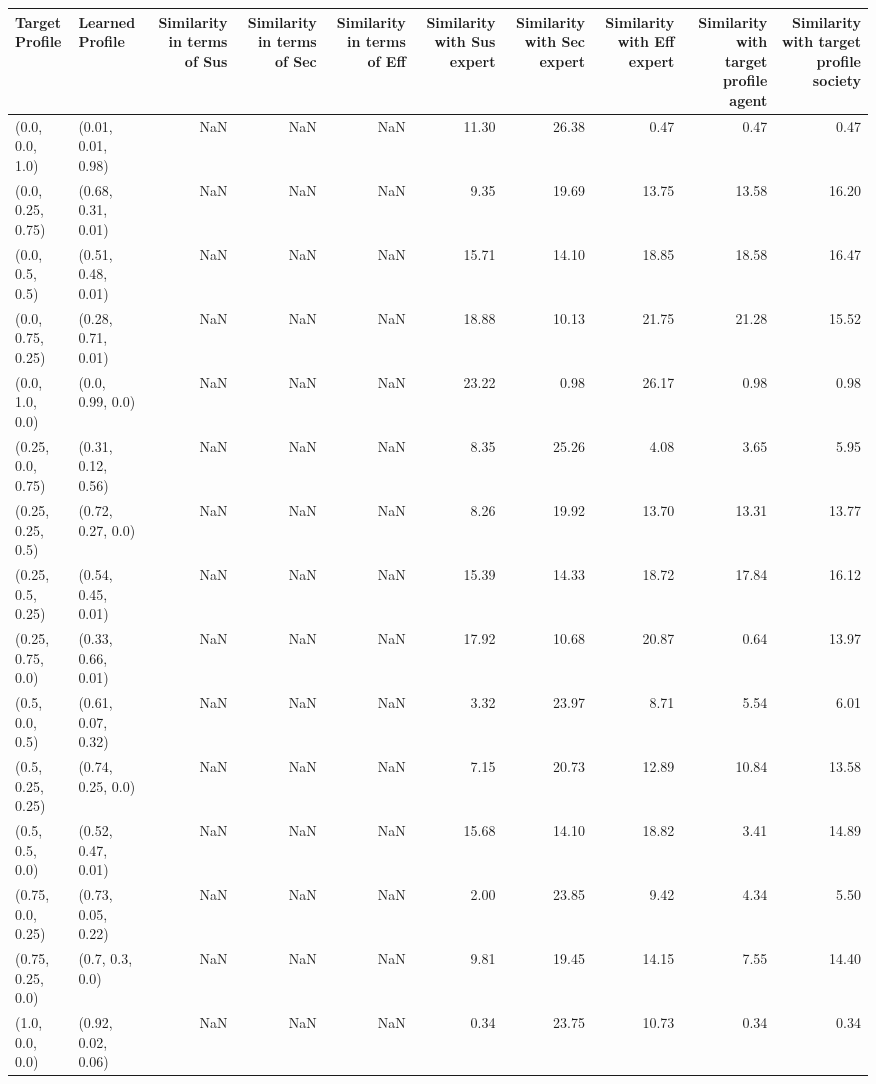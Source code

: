 \begin{tabular}{llrrrrrrrr}
\toprule
Target Profile & Learned Profile & Similarity in terms of Sus & Similarity in terms of Sec & Similarity in terms of Eff & Similarity with Sus expert & Similarity with Sec expert & Similarity with Eff expert & Similarity with target profile agent & Similarity with target profile society \\
\midrule
(0.0, 0.0, 1.0) & (0.01, 0.01, 0.98) & NaN & NaN & NaN & 11.30 & 26.38 & 0.47 & 0.47 & 0.47 \\
(0.0, 0.25, 0.75) & (0.68, 0.31, 0.01) & NaN & NaN & NaN & 9.35 & 19.69 & 13.75 & 13.58 & 16.20 \\
(0.0, 0.5, 0.5) & (0.51, 0.48, 0.01) & NaN & NaN & NaN & 15.71 & 14.10 & 18.85 & 18.58 & 16.47 \\
(0.0, 0.75, 0.25) & (0.28, 0.71, 0.01) & NaN & NaN & NaN & 18.88 & 10.13 & 21.75 & 21.28 & 15.52 \\
(0.0, 1.0, 0.0) & (0.0, 0.99, 0.0) & NaN & NaN & NaN & 23.22 & 0.98 & 26.17 & 0.98 & 0.98 \\
(0.25, 0.0, 0.75) & (0.31, 0.12, 0.56) & NaN & NaN & NaN & 8.35 & 25.26 & 4.08 & 3.65 & 5.95 \\
(0.25, 0.25, 0.5) & (0.72, 0.27, 0.0) & NaN & NaN & NaN & 8.26 & 19.92 & 13.70 & 13.31 & 13.77 \\
(0.25, 0.5, 0.25) & (0.54, 0.45, 0.01) & NaN & NaN & NaN & 15.39 & 14.33 & 18.72 & 17.84 & 16.12 \\
(0.25, 0.75, 0.0) & (0.33, 0.66, 0.01) & NaN & NaN & NaN & 17.92 & 10.68 & 20.87 & 0.64 & 13.97 \\
(0.5, 0.0, 0.5) & (0.61, 0.07, 0.32) & NaN & NaN & NaN & 3.32 & 23.97 & 8.71 & 5.54 & 6.01 \\
(0.5, 0.25, 0.25) & (0.74, 0.25, 0.0) & NaN & NaN & NaN & 7.15 & 20.73 & 12.89 & 10.84 & 13.58 \\
(0.5, 0.5, 0.0) & (0.52, 0.47, 0.01) & NaN & NaN & NaN & 15.68 & 14.10 & 18.82 & 3.41 & 14.89 \\
(0.75, 0.0, 0.25) & (0.73, 0.05, 0.22) & NaN & NaN & NaN & 2.00 & 23.85 & 9.42 & 4.34 & 5.50 \\
(0.75, 0.25, 0.0) & (0.7, 0.3, 0.0) & NaN & NaN & NaN & 9.81 & 19.45 & 14.15 & 7.55 & 14.40 \\
(1.0, 0.0, 0.0) & (0.92, 0.02, 0.06) & NaN & NaN & NaN & 0.34 & 23.75 & 10.73 & 0.34 & 0.34 \\
\bottomrule
\end{tabular}
